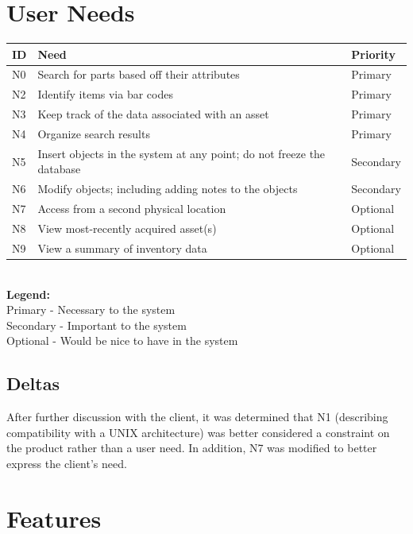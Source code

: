 \documentclass{article}
\begin{document}
\section{User Needs}
\begin{tabular}{ | p{0.15in} | p{4.0in} | p{.75in} |}
\hline
\textbf{ID} & \textbf{Need} & \textbf{Priority} \\
\hline
\hline
N0 & Search for parts based off their attributes & Primary \\
\hline
N2 & Identify items via bar codes & Primary \\
\hline
N3 & Keep track of the data associated with an asset & Primary \\
\hline
N4 & Organize search results & Primary \\
\hline
N5 & Insert objects in the system at any point; do not freeze the database & Secondary \\
\hline
N6 & Modify objects; including adding notes to the objects & Secondary \\
\hline
N7 & Access from a second physical location & Optional \\
\hline
N8 & View most-recently acquired asset(s) & Optional \\
\hline
N9 & View a summary of inventory data & Optional \\
\hline
\end{tabular} \\
\textbf{Legend:} \\
Primary - Necessary to the system \\
Secondary - Important to the system \\
Optional - Would be nice to have in the system \\

\subsection{Deltas}
After further discussion with the client, it was determined that N1 (describing compatibility with a UNIX architecture) was better considered a constraint on the product rather than a user need.  In addition, N7 was modified to better express the client's need.

\section{Features}
\end{document}
